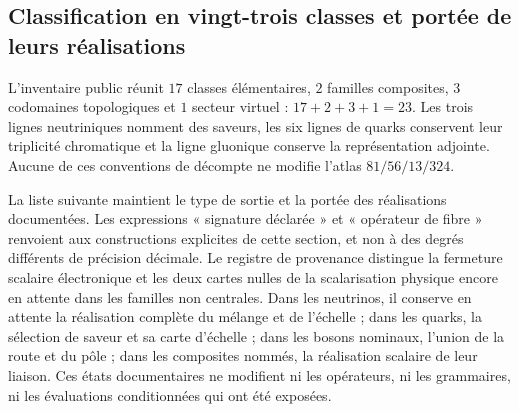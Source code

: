 \subsection{Classification en vingt-trois classes et portée de leurs réalisations}
\label{vi:vi:subsec:23-clases}

L'inventaire public réunit \(17\) classes élémentaires, \(2\) familles
composites, \(3\) codomaines topologiques et \(1\) secteur virtuel :
\(17+2+3+1=23\). Les trois lignes neutriniques nomment des saveurs, les
six lignes de quarks conservent leur triplicité chromatique et la ligne gluonique
conserve la représentation adjointe. Aucune de ces conventions de
décompte ne modifie l'atlas \(81/56/13/324\).

La liste suivante maintient le type de sortie et la portée des
réalisations documentées. Les expressions « signature déclarée » et
« opérateur de fibre » renvoient aux constructions explicites de cette
section, et non à des degrés différents de précision décimale.
Le registre de provenance distingue la fermeture scalaire électronique et
les deux cartes nulles de la scalarisation physique encore en attente dans
les familles non centrales. Dans les neutrinos, il conserve en attente la
réalisation complète du mélange et de l'échelle ; dans les quarks, la sélection de
saveur et sa carte d'échelle ; dans les bosons nominaux, l'union de la route
et du pôle ; dans les composites nommés, la réalisation scalaire de leur
liaison. Ces états documentaires ne modifient ni les opérateurs, ni les
grammaires, ni les évaluations conditionnées qui ont été exposées.

